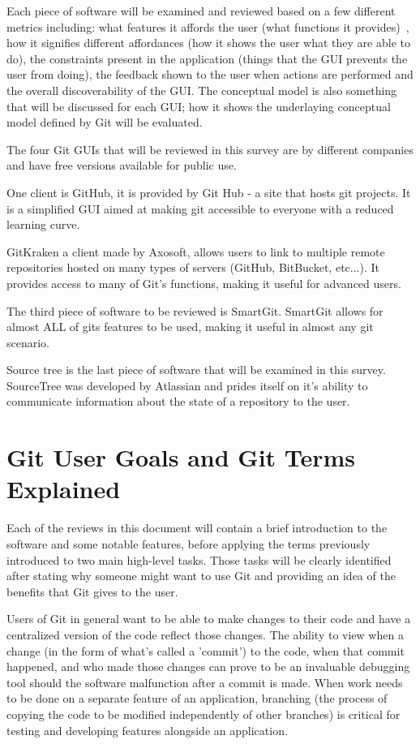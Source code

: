 \documentclass{sigchi}
\begin{document}
 Each piece of software will be examined and reviewed based on a few different metrics including: what features it affords the 
user (what functions it provides)~\cite{Norman:2013}, how it signifies different affordances (how it shows
the user what they are able to do), the constraints present in the application
(things that the GUI prevents the user from doing), the feedback shown to the 
user when actions are performed and the overall discoverability of the GUI.
The conceptual model is also something that will be discussed for each GUI; how
it shows the underlaying conceptual model defined by Git will be evaluated.

The four Git GUIs that will be reviewed in this survey are by different companies and have
free versions available for public use. 

One client is GitHub, it is provided by Git Hub - a site that hosts git projects. It is a simplified GUI aimed at making git accessible to everyone
with a  reduced learning curve.

 GitKraken a client made by Axosoft, allows users to link to multiple remote repositories hosted on many types of servers (GitHub, BitBucket, etc...).
It provides access to many of Git's functions, making it useful for advanced users.

The third piece of software to be reviewed is SmartGit. SmartGit allows for almost ALL of gits
features to be used, making it useful in almost any git scenario. 

Source tree is the last piece of software that will be examined in this survey. SourceTree was developed by Atlassian and
prides itself on it's ability to communicate information about the state of a repository to the user.

\section{Git User Goals and Git Terms Explained}
Each of the reviews in this document will contain a brief introduction to the software and some notable features, before applying 
the terms previously introduced to two main high-level tasks. Those tasks will be clearly identified 
after stating why someone might want to use Git and providing an idea of the benefits that Git gives to the user.

Users of Git in general want to be able to make changes to their code and have a centralized version of the code reflect those changes. 
The ability to view when a change (in the form of what's called a 'commit') to the code, when that
commit happened, and who made those changes can prove to be an invaluable debugging tool
should the software malfunction after a commit is made. When work needs to be done on a 
separate feature of an application, branching (the process of copying the code to be modified
independently of other branches) is critical for testing and developing features alongside an application.
\end{document}
